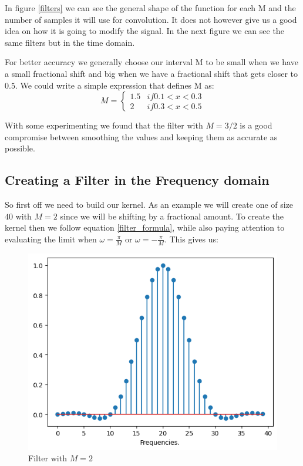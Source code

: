 \documentclass[]{usiinfbachelorproject}
\begin{document}
	In figure \ref{filters} we can see the general shape of the function for each M and the number of samples it will use for convolution. It does not however give us a good idea on how it is going to modify the signal. In the next figure we can see the same filters but in the time domain.
	
	
	For better accuracy we generally choose our interval M to be small when we have a small fractional shift and big when we have a fractional shift that gets closer to $0.5$. We could write a simple expression that defines M as:
	\begin{equation*}
		M = 
		\begin{cases}
			1.5 & if 0.1 < x < 0.3\\
			2 & if 0.3 < x < 0.5
		\end{cases}
	\end{equation*}
	
	With some experimenting we found that the filter with $M=3/2$ is a good compromise between smoothing the values and keeping them as accurate as possible.
	
	\newpage
		\subsection{Creating a Filter in the Frequency domain}
	So first off we need to build our kernel. As an example we will create one of size $40$ with $M=2$ since we will be shifting by a fractional amount. To create the kernel then we follow equation \ref{filter_formula}, while also paying attention to evaluating the limit when $\omega=\frac{\pi}{M}$ or $\omega=-\frac{\pi}{M}$. This gives us:
	\begin{figure}[h]
		\centering
		\includegraphics[width=0.4\columnwidth]{images/filter_m_2.png}
		\caption{Filter with $M=2$}
		\label{original_filter}
	\end{figure}
	
	
	
\end{document}
